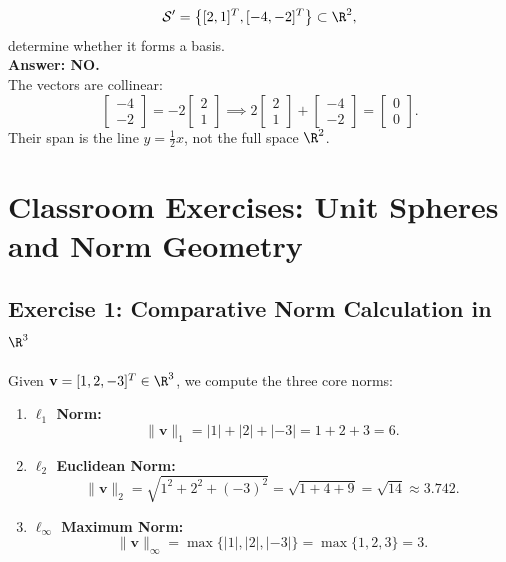 \begin{example}
\begin{enumerate}
    \[
        \mathcal{S}' = \left\{ [2, 1]^T, [-4, -2]^T \right\} \subset \R^2,
    \]
    determine whether it forms a basis. \\
    \textbf{Answer: NO.} \\
    The vectors are collinear:
    \begin{equation}
        \begin{bmatrix} -4 \\ -2 \end{bmatrix} = -2 \begin{bmatrix} 2 \\ 1 \end{bmatrix} \implies 2 \begin{bmatrix} 2 \\ 1 \end{bmatrix} + \begin{bmatrix} -4 \\ -2 \end{bmatrix} = \begin{bmatrix} 0 \\ 0 \end{bmatrix}.
    \end{equation}
    Their span is the line $y = \frac{1}{2}x$, not the full space $\R^2$.
\end{enumerate}
\end{example}

\FloatBarrier
\section{Classroom Exercises: Unit Spheres and Norm Geometry}

\subsection{Exercise 1: Comparative Norm Calculation in \texorpdfstring{$\R^3$}{R3}}
Given $\mathbf{v} = [1, 2, -3]^T \in \R^3$, we compute the three core norms:
\begin{enumerate}
    \item \textbf{$\ell_1$ Norm:}
    \begin{equation}
        \|\mathbf{v}\|_1 = |1| + |2| + |-3| = 1 + 2 + 3 = 6.
    \end{equation}
    \item \textbf{$\ell_2$ Euclidean Norm:}
    \begin{equation}
        \|\mathbf{v}\|_2 = \sqrt{1^2 + 2^2 + (-3)^2} = \sqrt{1 + 4 + 9} = \sqrt{14} \approx 3.742.
    \end{equation}
    \item \textbf{$\ell_\infty$ Maximum Norm:}
    \begin{equation}
        \|\mathbf{v}\|_\infty = \max\{|1|, |2|, |-3|\} = \max\{1, 2, 3\} = 3.
    \end{equation}
\end{enumerate}

